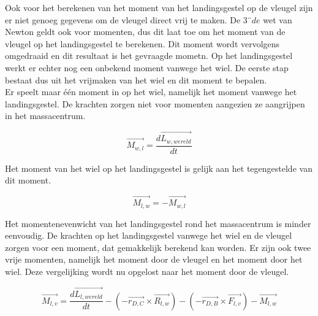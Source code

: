 Ook voor het berekenen van het moment van het landingsgestel op de vleugel zijn er niet genoeg gegevens om de vleugel direct vrij te maken. De $3¨{de}$ wet van Newton geldt ook voor momenten, dus dit laat toe om het moment van de vleugel op het landingsgestel te berekenen. Dit moment wordt vervolgens omgedraaid en dit resultaat is het gevraagde mometn. Op het landingsgestel werkt er echter nog een onbekend moment vanwege het wiel. De eerste stap bestaat dus uit het vrijmaken van het wiel en dit moment te bepalen.\\

Er speelt maar \'e\'en moment in op het wiel, namelijk het moment vanwege het landingsgestel. De krachten zorgen niet voor momenten aangezien ze aangrijpen in het massacentrum.

\begin{equation}
\overrightarrow{M_{w,l}}=\frac{d\overrightarrow{L_{w,wereld}}}{dt}
\end{equation}

Het moment van het wiel op het landingsgestel is gelijk aan het tegengestelde van dit moment.

\begin{equation*}
\overrightarrow{M_{l,w}}=-\overrightarrow{M_{w,l}}
\end{equation*}

Het momentenevenwicht van het landingsgestel rond het massacentrum is minder eenvoudig. De krachten op het landingsgestel vanwege het wiel en de vleugel zorgen voor een moment, dat gemakkelijk berekend kan worden. Er zijn ook twee vrije momenten, namelijk het moment door de vleugel en het moment door het wiel. Deze vergelijking wordt nu opgelost naar het moment door de vleugel.

\begin{equation}
\overrightarrow{M_{l,v}}=\frac{d\overrightarrow{L_{l,wereld}}}{dt}-\left(-\overrightarrow{{r}_{D,C}}\times \overrightarrow{R_{l,w}}\right)-\left(-\overrightarrow{{r}_{D,B}}\times \overrightarrow{F_{l,v}} \right)-\overrightarrow{M_{l,w}}
\end{equation}

